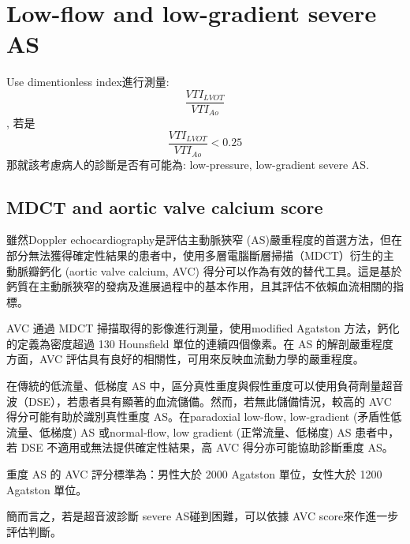 \documentclass[nols]{tufte-book}
\begin{document}
\section{Low-flow and low-gradient severe AS}
Use dimentionless index進行測量: \[ \frac{VTI_{LVOT}}{VTI_{Ao}} \], 若是 \[ \frac{VTI_{LVOT}}{VTI_{Ao}} < 0.25  \] 那就該考慮病人的診斷是否有可能為: low-pressure, low-gradient severe AS. 

\subsection{MDCT and aortic valve calcium score}
雖然Doppler echocardiography是評估主動脈狹窄 (AS)嚴重程度的首選方法，但在部分無法獲得確定性結果的患者中，使用多層電腦斷層掃描（MDCT）衍生的主動脈瓣鈣化 (aortic valve calcium, AVC) 得分可以作為有效的替代工具。這是基於鈣質在主動脈狹窄的發病及進展過程中的基本作用，且其評估不依賴血流相關的指標。

AVC 通過 MDCT 掃描取得的影像進行測量，使用modified Agatston 方法，鈣化的定義為密度超過 130 Hounsfield 單位的連續四個像素。在 AS 的解剖嚴重程度方面，AVC 評估具有良好的相關性，可用來反映血流動力學的嚴重程度。

在傳統的低流量、低梯度 AS 中，區分真性重度與假性重度可以使用負荷劑量超音波（DSE），若患者具有顯著的血流儲備。然而，若無此儲備情況，較高的 AVC 得分可能有助於識別真性重度 AS。在paradoxial low-flow, low-gradient (矛盾性低流量、低梯度) AS 或normal-flow, low gradient (正常流量、低梯度) AS 患者中，若 DSE 不適用或無法提供確定性結果，高 AVC 得分亦可能協助診斷重度 AS。

重度 AS 的 AVC 評分標準為：男性大於 2000 Agatston 單位，女性大於 1200 Agatston 單位。

簡而言之，若是超音波診斷 severe AS碰到困難，可以依據 AVC score來作進一步評估判斷。

\end{document}
